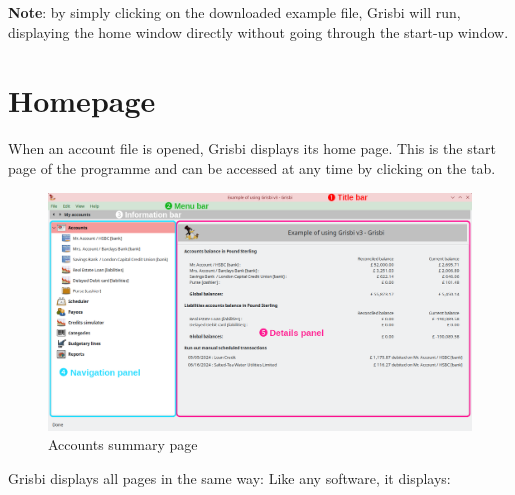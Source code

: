 
\textbf{Note}: by simply clicking on the downloaded example file, Grisbi will run, displaying the home window directly without going through the start-up window.%


\section{Homepage\label{home}}


When an account file is opened, Grisbi displays its home page.%
This is the start page of the programme and can be accessed at any time by clicking on the  tab.%


\begin{figure}[htbp]			%
	\begin{center}
		\includegraphics[width=1\textwidth]{image/screenshot/home_3.0.png}
	\end{center}
	\caption{Accounts summary page}		%
	\label{home_3.0}
\end{figure}


Grisbi displays all pages in the same way: Like any software, it displays:

